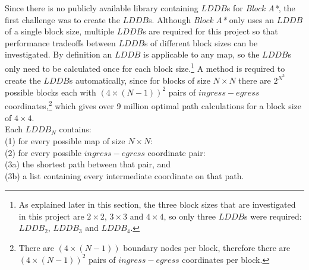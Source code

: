 \documentclass[12pt,notitlepage]{report}
\begin{document}
\noindent
Since there is no publicly available library containing $LDDB$s for {\em Block A*}, the first challenge was to create the $LDDB$s. Although {\em Block A*} only uses an $LDDB$ of a single block size, multiple $LDDB$s are required for this project so that performance tradeoffs between $LDDB$s of different block sizes can be investigated. By definition an $LDDB$ is applicable to any map, so the $LDDB$s only need to be calculated once for each block size.\footnote{As explained later in this section, the three block sizes that are investigated in this project are $2 \times 2$, $3 \times 3$ and $4 \times 4$, so only three $LDDB$s were required: $LDDB_{2}$, $LDDB_{3}$ and $LDDB_{4}$.} A method is required to create the $LDDB$s automatically, since for blocks of size {$N \times N$} there are $2^{N^{2}}$ possible blocks each with $(4 \times (N-1))^2$ pairs of $ingress-egress$ coordinates,\footnote{There are $(4 \times (N-1))$ boundary nodes per block, therefore there are $(4 \times (N-1))^2$ pairs of $ingress-egress$ coordinates per block.} which gives over 9 million optimal path calculations for a block size of $4 \times 4$.\\

\noindent
Each $LDDB_{N}$ contains:\\
(1) \indent for every possible map of size $N \times N$:\\
(2) \indent \indent for every possible $ingress-egress$ coordinate pair:\\
(3a) \indent \indent \indent the shortest path between that pair, and\\
(3b) \indent \indent \indent a list containing every intermediate coordinate on that path.\\
\end{document}
